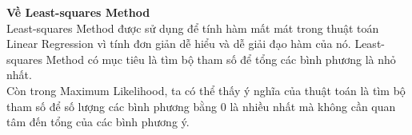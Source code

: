 \documentclass[12pt,letterpaper]{article}
\begin{document}
\textbf{Về Least-squares Method}
\\ Least-squares Method được sử dụng để tính hàm mất mát trong thuật toán Linear Regression vì tính đơn giản dễ hiểu và dễ giải đạo hàm của nó. Least-squares Method có mục tiêu là tìm bộ tham số để tổng các bình phương là nhỏ nhất.
\\ Còn trong Maximum Likelihood, ta có thể thấy ý nghĩa của thuật toán là tìm bộ tham số để số lượng các bình phương bằng 0 là nhiều nhất mà không cần quan tâm đến tổng của các bình phương ý.
\end{document}
